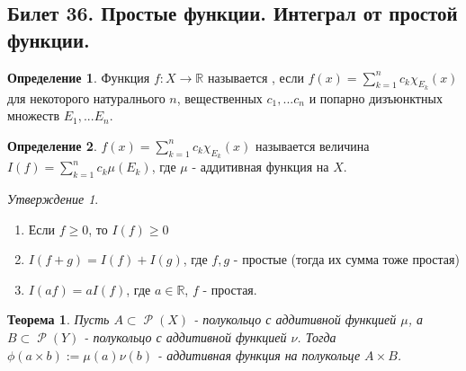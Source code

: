 \documentclass[a4paper]{article}
\theoremstyle{indented}
\newtheorem{theorem}{Теорема}
\theoremstyle{definition}
\newtheorem{defn}{Определение}
\theoremstyle{remark}
\newtheorem{stat}{Утверждение}
\DeclareMathOperator{\ra}{\rightarrow}
\DeclareMathOperator{\Rho}{\mathcal{P}}
\begin{document}
\subsection{Билет 36. Простые функции. Интеграл от простой функции.}
\begin{defn}
Функция $f: X \ra \mathbb{R}$ называется , если $f(x)=\sum_{k=1}^n c_k \chi_{E_k}(x)$ для некоторого натуралнього $n$, вещественных $c_1, ... c_n$ и попарно дизъюнктных множеств $E_1, ... E_n$.
\end{defn}
\begin{defn}
 $f(x)=\sum_{k=1}^n c_k \chi_{E_k}(x)$ называется величина $I(f)=\sum_{k=1}^n c_k \mu(E_k)$, где $\mu$ - аддитивная функция на $X$.
\end{defn}
\begin{stat}
\begin{enumerate}
    \item Если $f \geq 0$, то $I(f) \geq 0$
    \item $I(f+g)=I(f)+I(g)$, где $f, g$ - простые (тогда их сумма тоже простая)
    \item $I(af)=aI(f)$, где $a \in \mathbb{R}$, $f$ - простая.
\end{enumerate}
\end{stat}

\begin{theorem}
Пусть $A \subset \Rho(X)$ - полукольцо с аддитивной функцией $\mu$, а $B \subset \Rho(Y)$ - полукольцо с аддитивной функцией $\nu$. Тогда $\phi (a \times b) := \mu (a) \nu(b)$ - аддитивная функция на полукольце $A \times B$.
\end{theorem}
\end{document}
